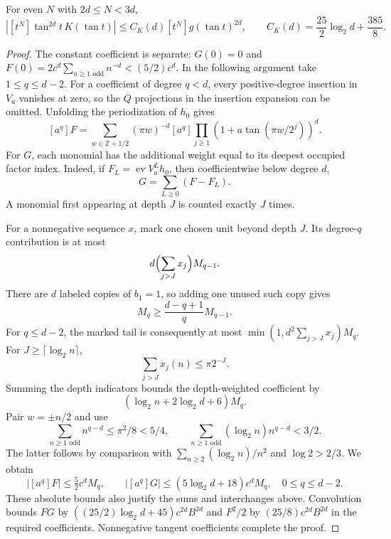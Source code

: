 \documentclass[11pt,a4paper]{article}
\theoremstyle{remark}\newtheorem*{ednote}{Editorial note (ProveIt, 2026-10-01)}
\newcommand{\ev}{\operatorname{ev}}\newcommand{\Z}{\mathbb Z}\newcommand{\C}{\mathbb C}
\begin{document}
\begin{lemma}\label{lem:quadratic}
For even $N$ with $2d\le N<3d$,
\[
 \left|[t^N]\tan^{2d}t\,K(\tan t)\right|
 \le C_K(d)[t^N]g(\tan t)^{2d},\qquad
 C_K(d)=\frac{25}{2}\log_2d+\frac{385}{8}.
\]
\end{lemma}
\begin{proof}
The constant coefficient is separate: $G(0)=0$ and
$F(0)=2c^d\sum_{n\ge1\text{ odd}}n^{-d}<(5/2)c^d$.
In the following argument take $1\le q\le d-2$.
For a coefficient of degree $q<d$, every positive-degree insertion in $V_a$ vanishes at zero, so the $Q$ projections in the insertion expansion can be omitted. Unfolding the periodization of $h_0$ gives
\[
 [a^q]F=\sum_{w\in\Z+1/2}(\pi w)^{-d}
 [a^q]\prod_{j\ge1}(1+a\tan(\pi w/2^j))^d.
\]
For $G$, each monomial has the additional weight equal to its deepest occupied factor index. Indeed, if $F_L=\ev V_a^Lh_0$, then coefficientwise below degree $d$,
\[
 G=\sum_{L\ge0}(F-F_L).
\]
A monomial first appearing at depth $J$ is counted exactly $J$ times.

For a nonnegative sequence $x$, mark one chosen unit beyond depth $J$. Its degree-$q$ contribution is at most
\[
 d\Bigl(\sum_{j>J}x_j\Bigr)M_{q-1}.
\]
There are $d$ labeled copies of $b_1=1$, so adding one unused such copy gives
\[
 M_q\ge\frac{d-q+1}{q}M_{q-1}.
\]
For $q\le d-2$, the marked tail is consequently at most
$\min(1,d^2\sum_{j>J}x_j)M_q$. For $J\ge\lceil\log_2n\rceil$,
\[
 \sum_{j>J}x_j(n)\le\pi2^{-J}.
\]
Summing the depth indicators bounds the depth-weighted coefficient by
\[
 (\log_2n+2\log_2d+6)M_q.
\]
Pair $w=\pm n/2$ and use
\[
 \sum_{n\ge1\text{ odd}}n^{q-d}\le\pi^2/8<5/4,\qquad
 \sum_{n\ge1\text{ odd}}(\log_2n)n^{q-d}<3/2.
\]
The latter follows by comparison with $\sum_{n\ge2}(\log_2n)/n^2$ and $\log2>2/3$. We obtain
\[
 |[a^q]F|\le\tfrac52c^dM_q,\qquad
 |[a^q]G|\le(5\log_2d+18)c^dM_q,\quad 0\le q\le d-2.
\]
These absolute bounds also justify the sums and interchanges above. Convolution bounds $FG$ by $((25/2)\log_2d+45)c^{2d}B^{2d}$ and $F^2/2$ by $(25/8)c^{2d}B^{2d}$ in the required coefficients. Nonnegative tangent coefficients complete the proof.
\end{proof}
\end{document}
